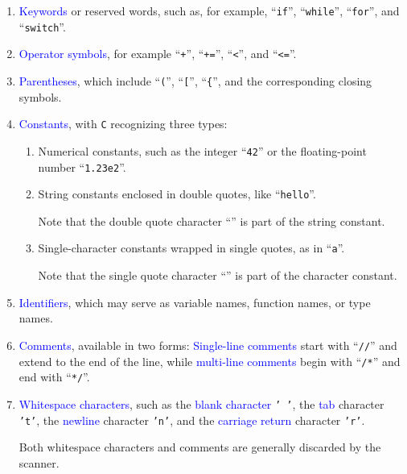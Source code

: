 \begin{enumerate}
\item \textcolor{blue}{Keywords} or reserved words, such as, for example, ``\texttt{if}'', ``\texttt{while}'',
      ``\texttt{for}'', and ``\texttt{switch}''. 
\item \textcolor{blue}{Operator symbols}, for example ``\texttt{+}'', ``\texttt{+=}'', ``\texttt{<}'',
      and ``\texttt{<=}''.
\item \textcolor{blue}{Parentheses}, which include ``\texttt{(}'', ``\texttt{[}'', ``\texttt{\{}'', and the
      corresponding closing symbols. 
\item \textcolor{blue}{Constants}, with \texttt{C} recognizing three types:
    \begin{enumerate}
    \item Numerical constants, such as the integer ``\texttt{42}'' or the floating-point number
          ``\texttt{1.23e2}''. 
    \item String constants enclosed in double quotes, like ``\texttt{hello}''.

          Note that the double quote character ``\texttt{}'' is part of the string constant.
    \item Single-character constants wrapped in single quotes, as in ``\texttt{a}''.

          Note that the single quote character ``\texttt{}'' is part of the character constant.
    \end{enumerate}
\item \textcolor{blue}{Identifiers}, which may serve as variable names, function names, or type names.
\item \textcolor{blue}{Comments}, available in two forms: \textcolor{blue}{Single-line comments} start with
      ``\texttt{//}'' and extend to the end of the line, while \textcolor{blue}{multi-line comments} begin with
      ``\texttt{/*}'' and end with ``\texttt{*/}''. 
\item \textcolor{blue}{Whitespace characters}, such as the \textcolor{blue}{blank character} \texttt{' '},
      the \textcolor{blue}{tab} character \texttt{'t'}, the \textcolor{blue}{newline} character
      \texttt{'n'}, and the \textcolor{blue}{carriage return} character \texttt{'r'}. 

Both whitespace characters and comments are generally discarded by the scanner.
\end{enumerate}


